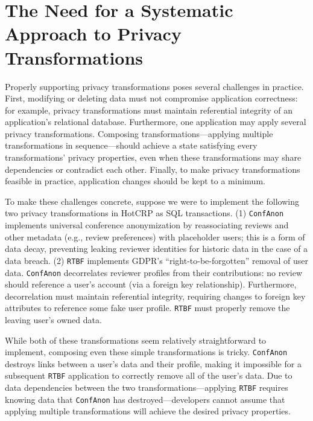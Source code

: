 \section{The Need for a Systematic Approach to Privacy Transformations}
Properly supporting privacy transformations poses several challenges in practice. First, modifying or
deleting data must not compromise application correctness: for example, privacy transformations must
maintain referential integrity of an application's relational database.
%
Furthermore, one application may apply several privacy transformations. Composing
transformations---applying multiple transformations in sequence---should achieve a state satisfying
every transformations' privacy properties, even when these transformations may share dependencies or
contradict each other.
%
Finally, to make privacy transformations feasible in practice, application changes should be kept to
a minimum.
%

%
To make these challenges concrete, suppose we were to implement the following two privacy
transformations in HotCRP as SQL transactions. (1) \texttt{ConfAnon} implements universal conference
anonymization by reassociating reviews and other metadata (e.g., review preferences) with
placeholder users; this is a form of data decay, preventing leaking reviewer identities for historic data in
the case of a data breach. (2) \texttt{RTBF} implements GDPR's ``right-to-be-forgotten'' removal of user data.
%
\texttt{ConfAnon} decorrelates reviewer profiles from their contributions: no review should reference a
user's account (via a foreign key relationship).
Furthermore, decorrelation must maintain referential integrity, requiring changes to foreign key
attributes to reference some fake user profile.
\texttt{RTBF} must properly remove the leaving user's owned data.

While both of these transformations seem relatively straightforward to implement, composing even
these simple transformations is tricky. \texttt{ConfAnon} destroys links between a user's data and
their profile, making it impossible for a subsequent \texttt{RTBF} application to correctly remove
all of the user's data. Due to data dependencies between the two transformations---applying
\texttt{RTBF} requires knowing data that \texttt{ConfAnon} has destroyed---developers cannot assume
that applying multiple transformations will achieve the desired privacy properties.
%


